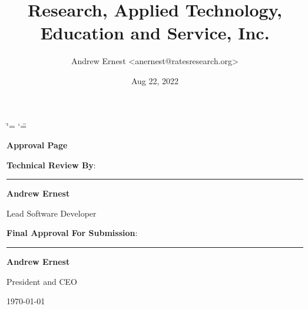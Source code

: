 \documentclass[letterpaper,12pt,english,openany,oneside]{sphinxmanual}
\title{Research, Applied Technology, Education and Service, Inc.}
\date{Aug 22, 2022}
\author{Andrew Ernest <anernest@ratesresearch.org>}
\begin{document}
\ifdefined\shorthandoff
  \ifnum\catcode`\=\string=\active\shorthandoff{=}\fi
  \ifnum\catcode`\"=\active{}\fi
\fi

\pagestyle{empty}
 
\sphinxmaketitle
    \newcommand\signature[3]{%
    {\sffamily
    \vspace{1cm}\par
    \textbf{#1}:\par
        \begin{minipage}{10cm}
        \centering
        \vspace{3cm}\par
        \rule{10cm}{1pt}\par
        \textbf{#2}\par
        #3%
        \end{minipage}
    }
    }
    \newcommand\insertdate[1][\today]{\vfill\begin{flushright}#1\end{flushright}}
    {\LARGE\sffamily \textbf{Approval Page}}
    
    \signature{Technical Review By}{Andrew Ernest}{Lead Software Developer}
    
    \signature{Final Approval For Submission}{Andrew Ernest}{President and CEO}
        
    \insertdate

\pagestyle{plain}
\sphinxtableofcontents
\pagestyle{normal}
\label{\detokenize{index::doc}}
\end{document}
